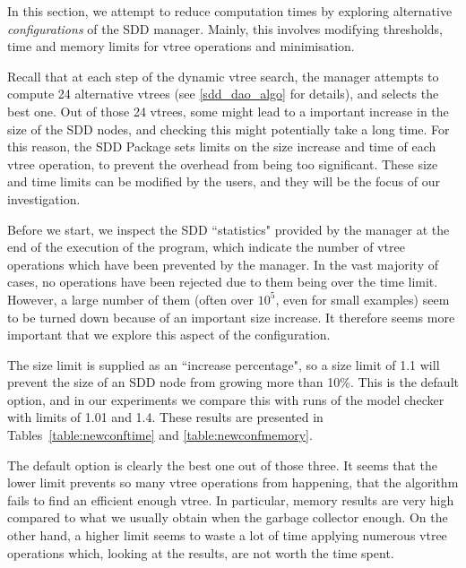 \documentclass[11pt]{report}
\begin{document}
In this section, we attempt to reduce computation times by exploring alternative \textit{configurations} of the SDD manager. Mainly, this involves modifying thresholds, time and memory limits for vtree operations and minimisation.

Recall that at each step of the dynamic vtree search, the manager attempts to compute 24 alternative vtrees (see \ref{sdd_dao_algo} for details), and selects the best one. Out of those 24 vtrees, some might lead to a important increase in the size of the SDD nodes, and checking this might potentially take a long time. For this reason, the SDD Package sets limits on the size increase and time of each vtree operation, to prevent the overhead from being too significant. These size and time limits can be modified by the users, and they will be the focus of our investigation. 

Before we start, we inspect the SDD ``statistics" provided by the manager at the end of the execution of the program, which indicate the number of vtree operations which have been prevented by the manager. In the vast majority of cases, no operations have been rejected due to them being over the time limit. However, a large number of them (often over $10^5$, even for small examples) seem to be turned down because of an important size increase. It therefore seems more important that we explore this aspect of the configuration.

The size limit is supplied as an ``increase percentage", so a size limit of 1.1 will prevent the size of an SDD node from growing more than 10\%. This is the default option, and in our experiments we compare this with runs of the model checker with limits of 1.01 and 1.4. These results are presented in Tables~\ref{table:newconftime} and \ref{table:newconfmemory}. 

The default option is clearly the best one out of those three. It seems that the lower limit prevents so many vtree operations from happening, that the algorithm fails to find an efficient enough vtree. In particular, memory results are very high compared to what we usually obtain when the garbage collector enough. On the other hand, a higher limit seems to waste a lot of time applying numerous vtree operations which, looking at the results, are not worth the time spent. 
\end{document}
